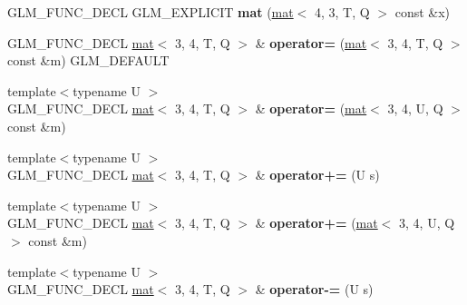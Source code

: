 \begin{DoxyCompactItemize}
G\+L\+M\+\_\+\+F\+U\+N\+C\+\_\+\+D\+E\+CL G\+L\+M\+\_\+\+E\+X\+P\+L\+I\+C\+IT {\bfseries mat} (\hyperlink{structglm_1_1mat}{mat}$<$ 4, 3, T, Q $>$ const \&x)
\item 
\mbox{\label{structglm_1_1mat_3_013_00_014_00_01T_00_01Q_01_4_a319c5f56fc885d0b670a384997aa1dea}} 
G\+L\+M\+\_\+\+F\+U\+N\+C\+\_\+\+D\+E\+CL \hyperlink{structglm_1_1mat}{mat}$<$ 3, 4, T, Q $>$ \& {\bfseries operator=} (\hyperlink{structglm_1_1mat}{mat}$<$ 3, 4, T, Q $>$ const \&m) G\+L\+M\+\_\+\+D\+E\+F\+A\+U\+LT
\item 
\mbox{\label{structglm_1_1mat_3_013_00_014_00_01T_00_01Q_01_4_a3e5f272b82d844017824b7f213ba8b57}} 
{\footnotesize template$<$typename U $>$ }\\G\+L\+M\+\_\+\+F\+U\+N\+C\+\_\+\+D\+E\+CL \hyperlink{structglm_1_1mat}{mat}$<$ 3, 4, T, Q $>$ \& {\bfseries operator=} (\hyperlink{structglm_1_1mat}{mat}$<$ 3, 4, U, Q $>$ const \&m)
\item 
\mbox{\label{structglm_1_1mat_3_013_00_014_00_01T_00_01Q_01_4_a9163c941f48d04e8f91190449d98de9c}} 
{\footnotesize template$<$typename U $>$ }\\G\+L\+M\+\_\+\+F\+U\+N\+C\+\_\+\+D\+E\+CL \hyperlink{structglm_1_1mat}{mat}$<$ 3, 4, T, Q $>$ \& {\bfseries operator+=} (U s)
\item 
\mbox{\label{structglm_1_1mat_3_013_00_014_00_01T_00_01Q_01_4_a73961279838cd60b4889d54bf955a3b1}} 
{\footnotesize template$<$typename U $>$ }\\G\+L\+M\+\_\+\+F\+U\+N\+C\+\_\+\+D\+E\+CL \hyperlink{structglm_1_1mat}{mat}$<$ 3, 4, T, Q $>$ \& {\bfseries operator+=} (\hyperlink{structglm_1_1mat}{mat}$<$ 3, 4, U, Q $>$ const \&m)
\item 
\mbox{\label{structglm_1_1mat_3_013_00_014_00_01T_00_01Q_01_4_adfa9d48451ea4991d39f4ed1649f8afd}} 
{\footnotesize template$<$typename U $>$ }\\G\+L\+M\+\_\+\+F\+U\+N\+C\+\_\+\+D\+E\+CL \hyperlink{structglm_1_1mat}{mat}$<$ 3, 4, T, Q $>$ \& {\bfseries operator-\/=} (U s)
\item 
\mbox{\label{structglm_1_1mat_3_013_00_014_00_01T_00_01Q_01_4_a0e378e1f0547facbe5707f64358a0eee}} 

\end{DoxyCompactItemize}
